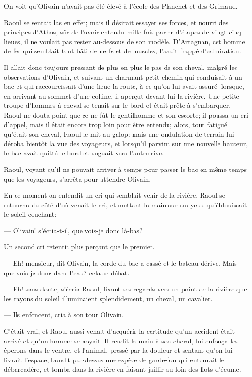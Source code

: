 On voit qu'Olivain n'avait pas été élevé à l'école des Planchet et des Grimaud.

Raoul se sentait las en effet; mais il désirait essayer ses forces, et nourri des principes d'Athos, sûr de l'avoir entendu mille fois parler d'étapes de vingt-cinq lieues, il ne voulait pas rester au-dessous de son modèle. D'Artagnan, cet homme de fer qui semblait tout bâti de nerfs et de muscles, l'avait frappé d'admiration.

Il allait donc toujours pressant de plus en plus le pas de son cheval, malgré les observations d'Olivain, et suivant un charmant petit chemin qui conduisait à un bac et qui raccourcissait d'une lieue la route, à ce qu'on lui avait assuré, lorsque, en arrivant au sommet d'une colline, il aperçut devant lui la rivière. Une petite troupe d'hommes à cheval se tenait sur le bord et était prête à s'embarquer. Raoul ne douta point que ce ne fût le gentilhomme et son escorte; il poussa un cri d'appel, mais il était encore trop loin pour être entendu; alors, tout fatigué qu'était son cheval, Raoul le mit au galop; mais une ondulation de terrain lui déroba bientôt la vue des voyageurs, et lorsqu'il parvint sur une nouvelle hauteur, le bac avait quitté le bord et voguait vers l'autre rive.

Raoul, voyant qu'il ne pouvait arriver à temps pour passer le bac en même temps que les voyageurs, s'arrêta pour attendre Olivain.

En ce moment on entendit un cri qui semblait venir de la rivière. Raoul se retourna du côté d'où venait le cri, et mettant la main sur ses yeux qu'éblouissait le soleil couchant:

— Olivain! s'écria-t-il, que vois-je donc là-bas?

Un second cri retentit plus perçant que le premier.

— Eh! monsieur, dit Olivain, la corde du bac a cassé et le bateau dérive. Mais que vois-je donc dans l'eau? cela se débat.

— Eh! sans doute, s'écria Raoul, fixant ses regards vers un point de la rivière que les rayons du soleil illuminaient splendidement, un cheval, un cavalier.

— Ils enfoncent, cria à son tour Olivain.

C'était vrai, et Raoul aussi venait d'acquérir la certitude qu'un accident était arrivé et qu'un homme se noyait. Il rendit la main à son cheval, lui enfonça les éperons dans le ventre, et l'animal, pressé par la douleur et sentant qu'on lui livrait l'espace, bondit par-dessus une espèce de garde-fou qui entourait le débarcadère, et tomba dans la rivière en faisant jaillir au loin des flots d'écume.


